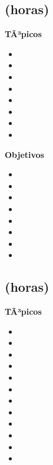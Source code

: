 \subsection{\ALDOSDef  (\ALDOSHours horas)}\label{sec:BOK-AL2}

\textbf{TÃ³picos}
\begin{itemize}
	\item \ALDOSTopicAlgoritmos
	\item \ALDOSTopicAlgoritmosgolosos
	\item \ALDOSTopicDividir
	\item \ALDOSTopicRegresion
	\item \ALDOSTopicBifurcacion
	\item \ALDOSTopicHeuristicas
	\item \ALDOSTopicCasamiento
	\item \ALDOSTopicAlgoritmosde
\end{itemize}

\textbf{Objetivos}
\begin{itemize}
	\item \ALDOSObjUNO
	\item \ALDOSObjDOS
	\item \ALDOSObjTRES
	\item \ALDOSObjCUATRO
	\item \ALDOSObjCINCO
	\item \ALDOSObjSEIS
	\item \ALDOSObjSIETE
	\item \ALDOSObjOCHO
\end{itemize}

\subsection{\ALTRESDef  (\ALTRESHours horas)}\label{sec:BOK-AL3}

\textbf{TÃ³picos}
\begin{itemize}
	\item \ALTRESTopicAlgoritmos
	\item \ALTRESTopicBusqueda
	\item \ALTRESTopicAlgoritmoscuadraticos
	\item \ALTRESTopicAlgoritmosde
	\item \ALTRESTopicTablas
	\item \ALTRESTopicArboles
	\item \ALTRESTopicRepresentacion
	\item \ALTRESTopicRecorridos
	\item \ALTRESTopicEl
	\item \ALTRESTopicCerradura
	\item \ALTRESTopicArbol
	\item \ALTRESTopicOrdenamiento
\end{itemize}

